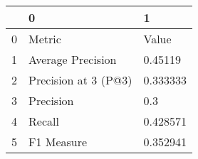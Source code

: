 \begin{tabular}{lll}
\toprule
{} &                     0 &         1 \\
\midrule
0 &                Metric &     Value \\
1 &     Average Precision &   0.45119 \\
2 &  Precision at 3 (P@3) &  0.333333 \\
3 &             Precision &       0.3 \\
4 &                Recall &  0.428571 \\
5 &            F1 Measure &  0.352941 \\
\bottomrule
\end{tabular}
